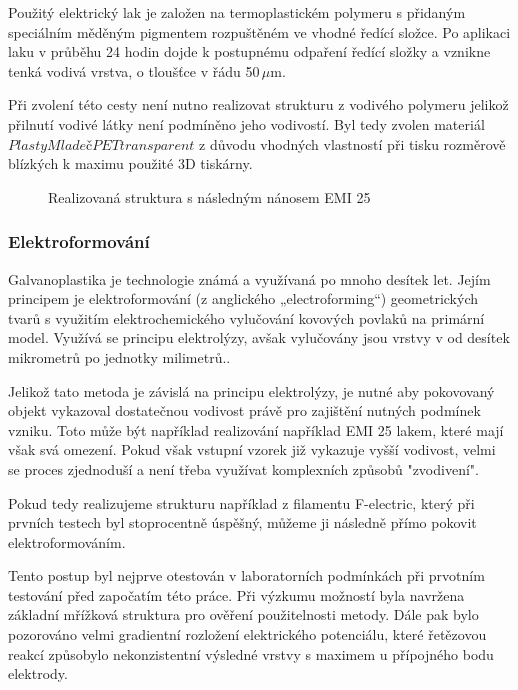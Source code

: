 Použitý elektrický lak je založen na termoplastickém polymeru s přidaným speciálním měděným pigmentem rozpuštěném ve vhodné ředící složce. Po aplikaci laku v průběhu 24 hodin dojde k postupnému odpaření ředící složky a vznikne tenká vodivá vrstva, o tloušťce v řádu 50\,$\mu$m.

Při zvolení této cesty není nutno realizovat strukturu z vodivého polymeru jelikož přilnutí vodivé látky není podmíněno jeho vodivostí. Byl tedy zvolen materiál $Plasty Mladeč PET transparent$ z důvodu vhodných vlastností při tisku rozměrově blízkých k maximu použité 3D tiskárny.


\begin{figure}[h]
\begin{center}
\caption{Realizovaná struktura s následným nánosem EMI 25}
\label{fig:HornEMI}
\end{center}
\end{figure}

\subsubsection{Elektroformování}
Galvanoplastika je technologie známá a využívaná po mnoho desítek let. Jejím principem je elektroformování (z anglického „electroforming“) geometrických tvarů s využitím elektrochemického vylučování kovových povlaků na primární model. Využívá se principu elektrolýzy, avšak vylučovány jsou vrstvy v od desítek mikrometrů po jednotky milimetrů.\cite{Electroforming}.

Jelikož tato metoda je závislá na principu elektrolýzy, je nutné aby pokovovaný objekt vykazoval dostatečnou vodivost právě pro zajištění nutných podmínek vzniku. Toto může být například realizování například EMI 25 lakem, které mají však svá omezení. Pokud však vstupní vzorek již vykazuje vyšší vodivost, velmi se proces zjednoduší a není třeba využívat komplexních způsobů "zvodivení".

Pokud tedy realizujeme strukturu například z filamentu F-electric, který při prvních testech byl stoprocentně úspěšný, můžeme ji následně přímo pokovit elektroformováním.

Tento postup byl nejprve otestován v laboratorních podmínkách při prvotním testování před započatím této práce. Při výzkumu možností byla navržena základní mřížková struktura pro ověření použitelnosti metody. Dále pak bylo pozorováno velmi gradientní rozložení elektrického potenciálu, které řetězovou reakcí způsobylo nekonzistentní výsledné vrstvy s maximem u přípojného bodu elektrody.

